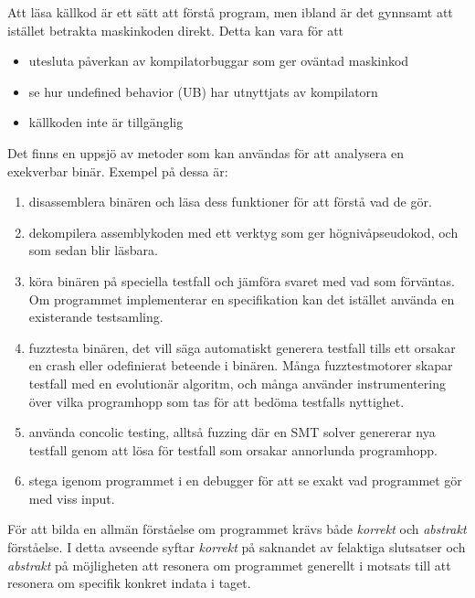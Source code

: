 
Att läsa källkod är ett sätt att förstå program, men ibland är det gynnsamt att istället betrakta
maskinkoden direkt. Detta kan vara för att
\begin{itemize}
  \item utesluta påverkan av kompilatorbuggar som ger oväntad maskinkod
  \item se hur undefined behavior (UB) har utnyttjats av kompilatorn
  \item källkoden inte är tillgänglig
\end{itemize}

Det finns en uppsjö av metoder som kan användas för att analysera en exekverbar
binär. Exempel på dessa är:
\begin{enumerate}
  \item disassemblera binären och läsa dess funktioner för att förstå vad de gör.
  \item dekompilera assemblykoden med ett verktyg som ger högnivåpseudokod, och som sedan blir läsbara.
  \item köra binären på speciella testfall och jämföra svaret med vad som förväntas. Om
    programmet implementerar en specifikation kan det istället använda en existerande testsamling.
  \item fuzztesta binären, det vill säga automatiskt generera testfall tills ett orsakar en crash eller
    odefinierat beteende i binären. Många fuzztestmotorer skapar testfall med en evolutionär
    algoritm, och många använder instrumentering över vilka programhopp som tas för att bedöma
    testfalls nyttighet.
  \item använda concolic testing, alltså fuzzing där en SMT solver genererar nya testfall genom att
    lösa för testfall som orsakar annorlunda programhopp.
  \item stega igenom programmet i en debugger för att se exakt vad programmet gör med viss input.
\end{enumerate}

För att bilda en allmän förståelse om programmet krävs både \textit{korrekt} och \textit{abstrakt} förståelse. 
I detta avseende syftar \textit{korrekt} på saknandet av felaktiga slutsatser
och \textit{abstrakt} på möjligheten att resonera om programmet generellt i
motsats till att resonera om specifik konkret indata i taget.

